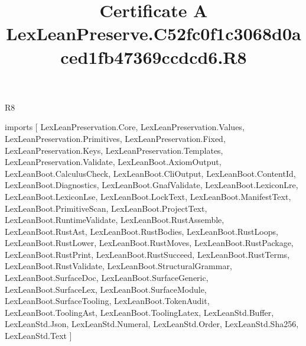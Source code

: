 \begin{lexlean}{R8}
\title{Certificate A LexLeanPreserve.C52fc0f1c3068d0aced1fb47369ccdcd6.R8}
\begin{coremodule}
imports [
  LexLeanPreservation.Core,
  LexLeanPreservation.Values,
  LexLeanPreservation.Primitives,
  LexLeanPreservation.Fixed,
  LexLeanPreservation.Keys,
  LexLeanPreservation.Templates,
  LexLeanPreservation.Validate,
  LexLeanBoot.AxiomOutput,
  LexLeanBoot.CalculusCheck,
  LexLeanBoot.CliOutput,
  LexLeanBoot.ContentId,
  LexLeanBoot.Diagnostics,
  LexLeanBoot.GnafValidate,
  LexLeanBoot.LexiconLre,
  LexLeanBoot.LexiconLse,
  LexLeanBoot.LockText,
  LexLeanBoot.ManifestText,
  LexLeanBoot.PrimitiveScan,
  LexLeanBoot.ProjectText,
  LexLeanBoot.RuntimeValidate,
  LexLeanBoot.RustAssemble,
  LexLeanBoot.RustAst,
  LexLeanBoot.RustBodies,
  LexLeanBoot.RustLoops,
  LexLeanBoot.RustLower,
  LexLeanBoot.RustMoves,
  LexLeanBoot.RustPackage,
  LexLeanBoot.RustPrint,
  LexLeanBoot.RustSucceed,
  LexLeanBoot.RustTerms,
  LexLeanBoot.RustValidate,
  LexLeanBoot.StructuralGrammar,
  LexLeanBoot.SurfaceDoc,
  LexLeanBoot.SurfaceGeneric,
  LexLeanBoot.SurfaceLex,
  LexLeanBoot.SurfaceModule,
  LexLeanBoot.SurfaceTooling,
  LexLeanBoot.TokenAudit,
  LexLeanBoot.ToolingAst,
  LexLeanBoot.ToolingLatex,
  LexLeanStd.Buffer,
  LexLeanStd.Json,
  LexLeanStd.Numeral,
  LexLeanStd.Order,
  LexLeanStd.Sha256,
  LexLeanStd.Text
]


\end{coremodule}
\end{lexlean}
